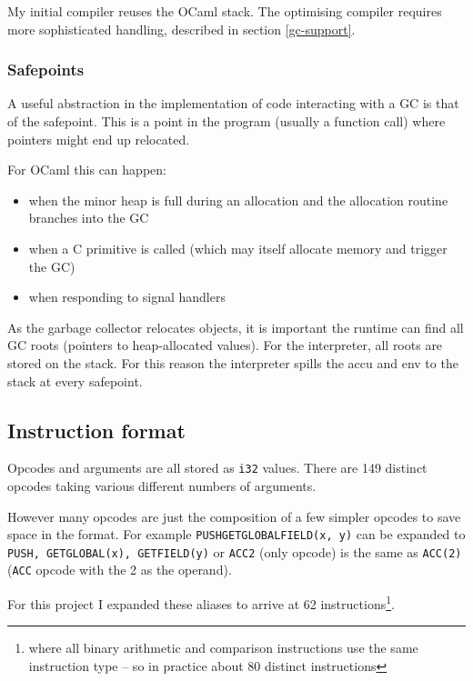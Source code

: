 My initial compiler reuses the OCaml stack. The optimising compiler requires more sophisticated
handling, described in section \ref{gc-support}.

\subsubsection{Safepoints}

A useful abstraction in the implementation of code interacting with a GC is that of the safepoint.
This is a point in the program (usually a function call) where pointers might end up relocated.

For OCaml this can happen:

\begin{itemize}
    \item when the minor heap is full during an allocation and the allocation routine branches
          into
          the
          GC
    \item when a C primitive is called	(which may itself allocate memory and trigger the
          GC)
    \item when responding to signal handlers
\end{itemize}

As the garbage collector relocates objects, it is important the runtime can find all GC roots
(pointers to heap-allocated values). For the interpreter, all roots are stored on the stack. For
this reason the interpreter spills the accu and env to the stack at every safepoint.

\subsection{Instruction format} \label{ocaml-bytecode-format}

Opcodes and arguments are all stored as \texttt{i32} values. There are 149 distinct opcodes taking
various
different numbers of arguments.

However many opcodes are just the composition of a few simpler opcodes to save space in the format.
For example \texttt{PUSHGETGLOBALFIELD(x, y)} can be expanded to \texttt{PUSH,
    GETGLOBAL(x), GETFIELD(y)} or \texttt{ACC2} (only opcode) is the same as \texttt{ACC(2)}
(\texttt{ACC} opcode with the 2 as the operand).

For this project I expanded these aliases to arrive at 62 instructions\footnote{where all binary
    arithmetic and comparison instructions use the same instruction type -- so in practice about 80
    distinct instructions}.

